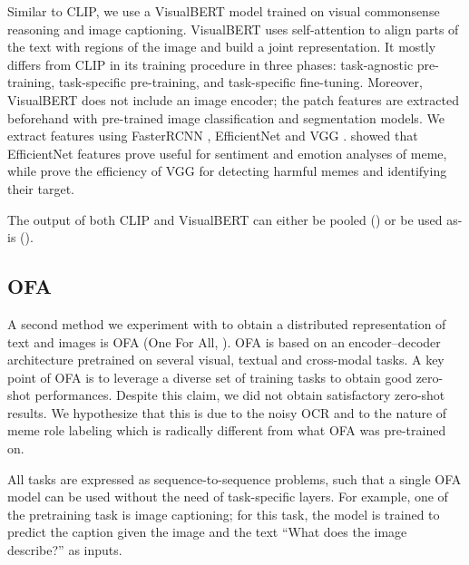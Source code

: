 Similar to CLIP, we use a VisualBERT model \cite{li2019visualbert} trained on visual commonsense reasoning and image captioning. 
VisualBERT uses self-attention to align parts of the text with regions of the image and build a joint representation.
It mostly differs from CLIP in its training procedure in three phases:
task-agnostic pre-training, task-specific pre-training, and task-specific fine-tuning. Moreover, VisualBERT does not include an image encoder; the patch features are extracted beforehand with pre-trained image classification and segmentation models. We extract features using FasterRCNN \cite{ren2015faster}, EfficientNet \cite{tan2019efficientnet} and VGG \cite{SimonyanZ14a}.  \citet{bucur2022blue} showed that EfficientNet features prove useful for sentiment and emotion analyses of meme, while \citet{pramanick-etal-2021-momenta-multimodal} prove the efficiency of VGG for detecting harmful memes and identifying their target.

The output of both CLIP and VisualBERT can either be pooled (\encoder[pool]) or be used as-is (\encoder[full]).





\subsection{OFA}
A second method we experiment with to obtain a distributed representation of text and images is OFA (One For All, \citealp{ofa}).
OFA is based on an encoder--decoder architecture pretrained on several visual, textual and cross-modal tasks.
A key point of OFA is to leverage a diverse set of training tasks to obtain good zero-shot performances.
Despite this claim, we did not obtain satisfactory zero-shot results.
We hypothesize that this is due to the noisy OCR and to the nature of meme role labeling which is radically different from what OFA was pre-trained on.

All tasks are expressed as sequence-to-sequence problems, such that a single OFA model can be used without the need of task-specific layers.
For example, one of the pretraining task is image captioning; for this task, the model is trained to predict the caption given the image and the text ``What does the image describe?'' as inputs.

